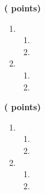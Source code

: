 \documentclass[12pt,french]{book}
\begin{document}
\begin{spacing}{1.2}
\begin{enumerate}[label=\arabic*.]
\begin{enumerate}[label=\alph*)]
		
	\end{enumerate}

\end{enumerate}






\medskip\exercice \hfill \textbf{( points)}\par
\begin{enumerate}[label=\arabic*.]
\item 
	\begin{enumerate}[label=\alph*)]
		
	\item 

		
	\item
	
	\end{enumerate}

\item 
\begin{enumerate}[label=\alph*)]
	\item 
	
	\item 
	
		
	\end{enumerate}

\end{enumerate}




\medskip\exercice \hfill \textbf{( points)}\par
\begin{enumerate}[label=\arabic*.]
\item 
	\begin{enumerate}[label=\alph*)]
		
	\item 

		
	\item
	
	\end{enumerate}

\item 
\begin{enumerate}[label=\alph*)]
	\item 
	
	\item 
	
		
	\end{enumerate}


\end{enumerate}
\end{spacing}
\end{document}
